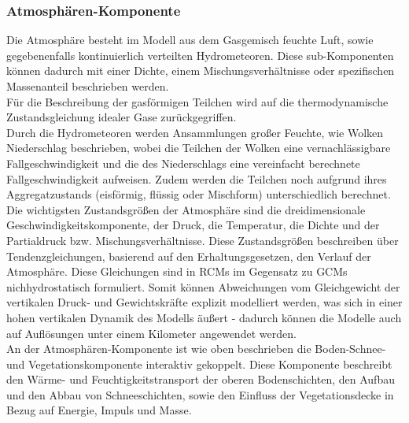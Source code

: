 \subsubsection{Atmosphären-Komponente}
Die Atmosphäre besteht im Modell aus dem Gasgemisch feuchte Luft, sowie gegebenenfalls kontinuierlich verteilten Hydrometeoren. Diese sub-Komponenten können dadurch mit einer Dichte, einem Mischungsverhältnisse oder spezifischen Massenanteil beschrieben werden.\\
Für die Beschreibung der gasförmigen Teilchen wird auf die thermodynamische Zustandsgleichung idealer Gase zurückgegriffen.\\
Durch die Hydrometeoren werden Ansammlungen großer Feuchte, wie Wolken Niederschlag beschrieben, wobei die Teilchen der Wolken eine vernachlässigbare Fallgeschwindigkeit und die des Niederschlags eine vereinfacht berechnete Fallgeschwindigkeit aufweisen. Zudem werden die Teilchen noch aufgrund ihres Aggregatzustands (eisförmig, flüssig oder Mischform) unterschiedlich berechnet.\\
Die wichtigsten Zustandsgrößen der Atmosphäre sind die dreidimensionale Geschwindigkeitskomponente, der Druck, die Temperatur, die Dichte und der Partialdruck bzw. Mischungsverhältnisse. Diese Zustandsgrößen beschreiben über Tendenzgleichungen, basierend auf den Erhaltungsgesetzen, den Verlauf der Atmosphäre. Diese Gleichungen sind in RCMs im Gegensatz zu GCMs nichhydrostatisch formuliert. Somit können Abweichungen vom Gleichgewicht der vertikalen Druck- und Gewichtskräfte explizit modelliert werden, was sich in einer hohen vertikalen Dynamik des Modells äußert - dadurch können die Modelle auch auf Auflösungen unter einem Kilometer angewendet werden.\\
An der Atmosphären-Komponente ist wie oben beschrieben die Boden-Schnee-und Vegetationskomponente interaktiv gekoppelt. Diese Komponente beschreibt den Wärme- und Feuchtigkeitstransport der oberen Bodenschichten, den Aufbau und den Abbau von Schneeschichten, sowie den Einfluss der Vegetationsdecke in Bezug auf Energie, Impuls und Masse.
